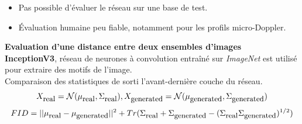 \documentclass[a0,portrait]{a0poster}
\newcommand{\equtext}[1]{\mbox{\small{#1}}}
\begin{document}
\begin{multicols}{2}
\begin{tcolorbox}[colback=blue!5!lime,colframe=green!75!black,title={\section*{Mesurer les performances d'un GAN?}}]
\begin{itemize}
    \item Pas possible d'évaluer le réseau sur une base de test.
    \item Évaluation humaine peu fiable, notamment pour les profils micro-Doppler.
\end{itemize}
\end{tcolorbox}
\bigskip


\begin{tcolorbox}[colback=blue!5!white,colframe=blue!75!black,title={\section*{FID (Fréchet Inception Distance)}}]
\textbf{Evaluation d'une distance entre deux ensembles d'images}\\
\textbf{InceptionV3}, réseau de neurones à convolution entraîné sur \textit{ImageNet} est utilisé pour extraire des motifs de l'image.\\
Comparaison des statistiques de sorti l'avant-dernière couche du réseau.%
\Large{
\[X_{\equtext{real}}=\mathcal{N}(\mu_{\equtext{real}}, \Sigma_{\equtext{real}}), X_{\equtext{generated}}=\mathcal{N}(\mu_{\equtext{generated}}, \Sigma_{\equtext{generated}})\]
\[FID = ||\mu_{\equtext{real}} - \mu_{\equtext{generated}}||^2 + Tr(\Sigma_{\equtext{real}} + \Sigma_{\equtext{generated}}  - (\Sigma_{\equtext{real}} \Sigma_{\equtext{generated}})^{1/2})\]
}
\end{tcolorbox}
\bigskip



\end{multicols}
\end{document}
